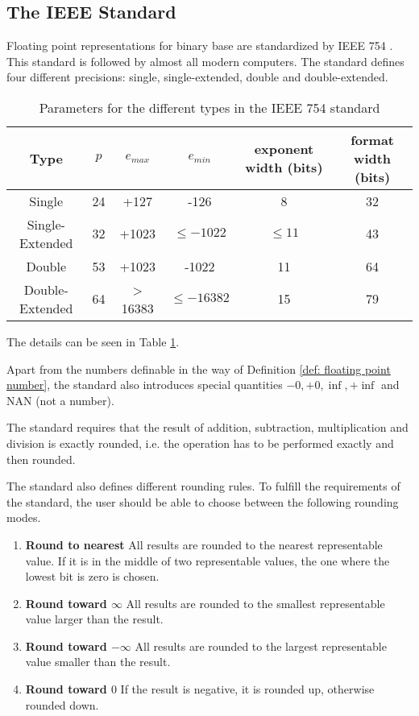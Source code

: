 \subsection{The IEEE Standard}
	Floating point representations for binary base are standardized by IEEE 754 \cite{ieee}. 
	This standard is followed by almost all modern computers.
	The standard defines four different precisions: single, single-extended, double and double-extended.
  \begin{table}
	  	\centering
	    \begin{tabular}{ | c || c | c | c | c | c | }
	    \hline
	    Type & $p$ & $e_{max}$ & $e_{min}$ & exponent width (bits) & format width (bits) \\ \hline \hline
	    Single & 24 & +127 & -126 & 8 & 32 \\ \hline
	    Single-Extended & 32 & +1023 & $\leq -1022$ & $\leq 11$ & 43 \\ \hline
	    Double & 53 & +1023 & -1022 & 11 & 64 \\ \hline
	    Double-Extended & 64 & > 16383 & $\leq -16382$ & 15 & 79 \\ \hline
	    \end{tabular}
	    \caption{Parameters for the different types in the IEEE 754 standard}\label{table:IEEE floating point}
 \end{table}
 The details can be seen in Table \ref{table:IEEE floating point}.

 Apart from the numbers definable in the way of Definition \ref{def:
 floating point number}, the standard also introduces special quantities $-0, +0, \inf, +\inf$ and NAN (not a number). 
    
	The standard requires that the result of addition, subtraction, multiplication and division is exactly rounded, 
	i.e. the operation has to be performed exactly and then rounded.
	
  The standard also defines different rounding rules. 
  To fulfill the requirements of the standard, the user should be able to
  choose between the following rounding modes.
  \begin{enumerate}
    \item \textbf{Round to nearest} 
      All results are rounded to the nearest representable value. 
      If it is in the middle of two representable values, the one where the
      lowest bit is zero is chosen.
    \item \textbf{Round toward $\infty$}
      All results are rounded to the smallest representable value larger than
      the result.
    \item \textbf{Round toward $-\infty$}
      All results are rounded to the largest representable value smaller than
      the result.
    \item \textbf{Round toward $0$}
      If the result is negative, it is rounded up, otherwise rounded down.
  \end{enumerate}
  
